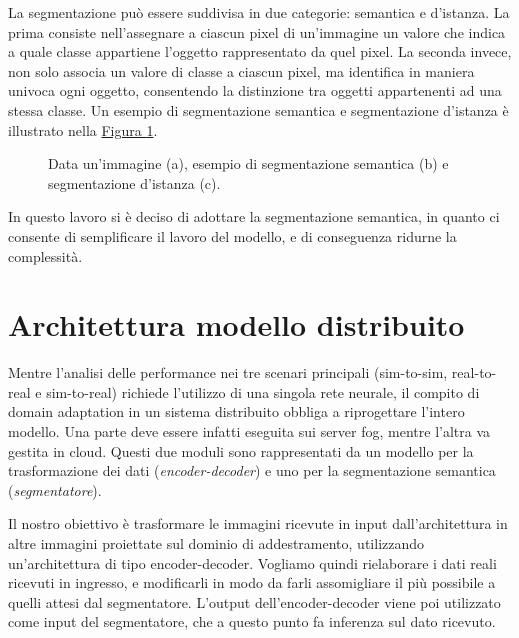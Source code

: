 \documentclass[12pt]{report}
\begin{document}
La segmentazione può essere suddivisa in due categorie: semantica e d'istanza. La prima consiste nell'assegnare a ciascun pixel di un'immagine un valore che indica a quale classe appartiene l'oggetto rappresentato da quel pixel. La seconda invece, non solo associa un valore di classe a ciascun pixel, ma identifica in maniera univoca ogni oggetto, consentendo la distinzione tra oggetti appartenenti ad una stessa classe. Un esempio di segmentazione semantica e segmentazione d'istanza è illustrato nella \hyperref[fig:segmentazione]{Figura \ref{fig:segmentazione}}.

\begin{figure}[t]
	\centering
	\hspace{0.01\textwidth}
	\hspace{0.01\textwidth}
	\caption{Data un'immagine (a), esempio di segmentazione semantica (b) e segmentazione d'istanza (c).}
	\label{fig:segmentazione}
\end{figure}

In questo lavoro si è deciso di adottare la segmentazione semantica, in quanto ci consente di semplificare il lavoro del modello, e di conseguenza ridurne la complessità.

\section{Architettura modello distribuito}
\label{sec:modello_per_fog_robotics}

Mentre l'analisi delle performance nei tre scenari principali (sim-to-sim, real-to-real e sim-to-real) richiede l'utilizzo di una singola rete neurale, il compito di domain adaptation in un sistema distribuito obbliga a riprogettare l'intero modello. Una parte deve essere infatti eseguita sui server fog, mentre l'altra va gestita in cloud. Questi due moduli sono rappresentati da un modello per la trasformazione dei dati (\textit{encoder-decoder}) e uno per la segmentazione semantica (\textit{segmentatore}).

Il nostro obiettivo è trasformare le immagini ricevute in input dall'architettura in altre immagini proiettate sul dominio di addestramento, utilizzando un'architettura di tipo encoder-decoder. Vogliamo quindi rielaborare i dati reali ricevuti in ingresso, e modificarli in modo da farli assomigliare il più possibile a quelli attesi dal segmentatore. L'output dell'encoder-decoder viene poi utilizzato come input del segmentatore, che a questo punto fa inferenza sul dato ricevuto.
\end{document}
